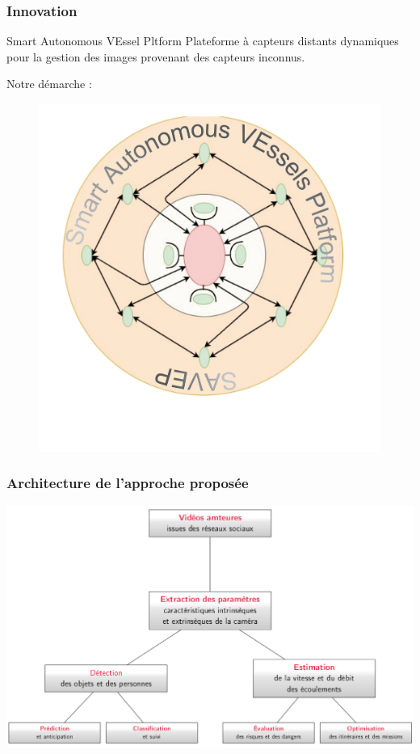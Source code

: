 \begin{frame}
	\frametitle{Innovation}
	\begin{block}{\large Smart Autonomous VEssel Pltform}
		\large Plateforme à \color{red}capteurs distants dynamiques \color{black} pour la gestion des \color{red}images provenant des capteurs inconnus\color{black}.
	\end{block}
	Notre démarche :
	\begin{figure}			
				\includegraphics[scale=0.3]{images/SAVEP/logoSAVEP.png}\\
	\end{figure}
\end{frame}


\begin{frame}
	\frametitle{Architecture de l'approche proposée}
	\begin{center}
		\includegraphics[scale=0.25]{images/ArchitechtureSavep.png}
	\end{center}

\end{frame}

